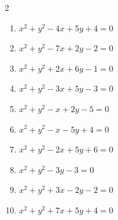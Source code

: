 \begin{multicols}{2}
\begin{enumerate}

  \item $x^{2}+y^{2}-4x+5y+4=0$


\columnbreak %

\resetques

  \item $x^{2}+y^{2}-7x+2y-2=0$


  \item $x^{2}+y^{2}+2x+6y-1=0$


  \item $x^{2}+y^{2}-3x+5y-3=0$


  \item $x^{2}+y^{2}-x+2y-5=0$


  \item $x^{2}+y^{2}-x-5y+4=0$


  \item $x^{2}+y^{2}-2x+5y+6=0$


  \item $x^{2}+y^{2}-3y-3=0$


  \item $x^{2}+y^{2}+3x-2y-2=0$


  \item $x^{2}+y^{2}+7x+5y+4=0$


\end{enumerate}
\end{multicols}
